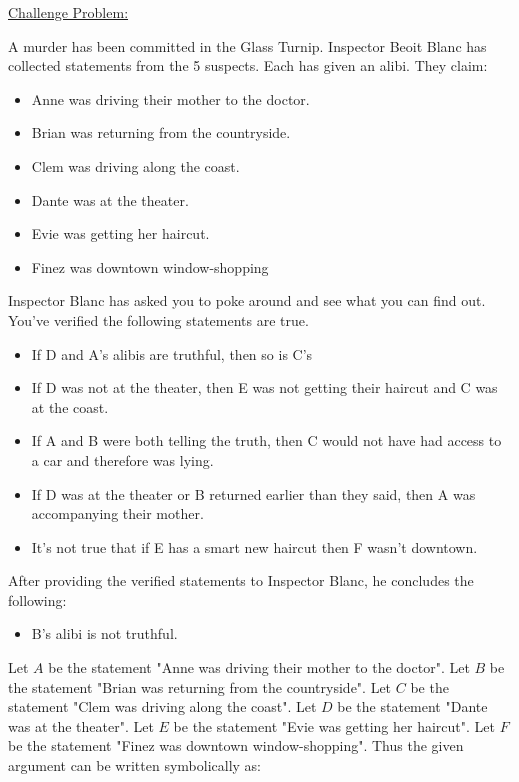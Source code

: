 \documentclass{article}
\theoremstyle{definition}
\begin{document}
	\vspace{.5cm}

	\noindent \underline{Challenge Problem:}

	A murder has been committed in the Glass Turnip. Inspector Beoit Blanc has collected statements from the 5 suspects. Each has given an alibi. They claim:

	\begin{itemize}
		\item[] Anne was driving their mother to the doctor.
		\item[] Brian was returning from the countryside.
		\item[] Clem was driving along the coast.
		\item[] Dante was at the theater.
		\item[] Evie was getting her haircut.
		\item[] Finez was downtown window-shopping
	\end{itemize}

	Inspector Blanc has asked you to poke around and see what you can find out. You’ve verified the following statements are true.

	\begin{itemize}
		\item If D and A’s alibis are truthful, then so is C’s
		\item If D was not at the theater, then E was not getting their haircut and C was at the coast.
		\item If A and B were both telling the truth, then C would not have had access to a car and therefore was lying.
		\item If D was at the theater or B returned earlier than they said, then A was accompanying their mother.
		\item It’s not true that if E has a smart new haircut then F wasn’t downtown.
	\end{itemize}

	After providing the verified statements to Inspector Blanc, he concludes the following:

	\begin{itemize}
		\item B's alibi is not truthful.
	\end{itemize}

	Let $A$ be the statement "Anne was driving their mother to the doctor". Let $B$ be the statement "Brian was returning from the countryside". Let $C$ be the statement "Clem was driving along the coast". Let $D$ be the statement "Dante was at the theater". Let $E$ be the statement "Evie was getting her haircut". Let $F$ be the statement "Finez was downtown window-shopping". Thus the given argument can be written symbolically as:
\end{document}

